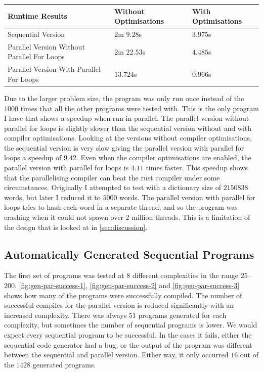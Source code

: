 \begin{tabularx}{\textwidth}{ | >{\centering\arraybackslash}X | >{\centering\arraybackslash}X | >{\centering\arraybackslash}X |}
	\hline
    Runtime Results & Without Optimisations & With Optimisations \\
    \hline
    Sequential Version & $2$m $9.28$s & $3.975$s \\
    \hline
    Parallel Version \hspace{5em} Without Parallel For Loops & $2$m $22.53$s & $4.485$s \\
    \hline
    Parallel Version \hspace{5em} With Parallel For Loops & $13.724$s & $0.966$s \\
    \hline
\end{tabularx}

Due to the larger problem size, the program was only run once instead of the $1000$ times that all the other programs were tested with. This is the only program I have that shows a speedup when run in parallel. The parallel version without parallel for loops is slightly slower than the sequential version without and with compiler optimisations. Looking at the versions without compiler optimisations, the sequential version is very slow giving the parallel version with parallel for loops a speedup of $9.42$. Even when the compiler optimisations are enabled, the parallel version with parallel for loops is $4.11$ times faster. This speedup shows that the parallelising compiler can beat the rust compiler under some circumstances. Originally I attempted to test with a dictionary size of $2150838$ words, but later I reduced it to $5000$ words. The parallel version with parallel for loops tries to hash each word in a separate thread, and so the program was crashing when it could not spawn over $2$ million threads. This is a limitation of the design that is looked at in \autoref{sec:discussion}.

\subsection{Automatically Generated Sequential Programs}
The first set of programs was tested at $8$ different complexities in the range $25$--$200$.
\autoref{fig:gen-par-success-1}, \autoref{fig:gen-par-success-2} and \autoref{fig:gen-par-success-3} shows how many of the programs were successfully compiled. The number of successful compiles for the parallel version is reduced significantly with an increased complexity. There was always $51$ programs generated for each complexity, but sometimes the number of sequential programs is lower. We would expect every sequential program to be successful. In the cases it fails, either the sequential code generator had a bug, or the output of the program was different between the sequential and parallel version. Either way, it only occurred $16$ out of the $1428$ generated programs.

